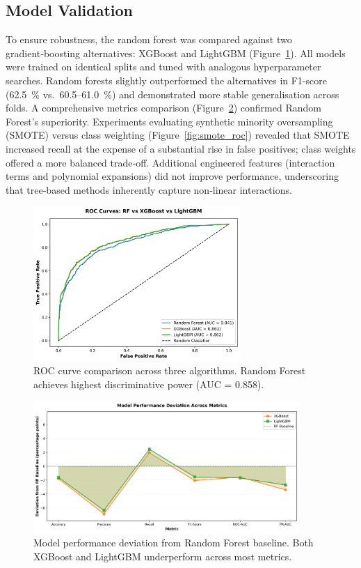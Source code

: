 \documentclass[12pt]{article}
\begin{document}
\subsection{Model Validation}
To ensure robustness, the random forest was compared against two gradient‑boosting alternatives: XGBoost and LightGBM (Figure~\ref{fig:model_comparison}).  All models were trained on identical splits and tuned with analogous hyperparameter searches.  Random forests slightly outperformed the alternatives in F1‑score (62.5~\% vs.\ 60.5–61.0~\%) and demonstrated more stable generalisation across folds.  A comprehensive metrics comparison (Figure~\ref{fig:metrics_comparison}) confirmed Random Forest's superiority.  Experiments evaluating synthetic minority oversampling (SMOTE) versus class weighting (Figure~\ref{fig:smote_roc}) revealed that SMOTE increased recall at the expense of a substantial rise in false positives; class weights offered a more balanced trade‑off.  Additional engineered features (interaction terms and polynomial expansions) did not improve performance, underscoring that tree‑based methods inherently capture non‑linear interactions.

\begin{figure}[H]
\centering
\includegraphics[width=0.7\textwidth]{img/21_model_comparison_roc.png}
\caption{ROC curve comparison across three algorithms. Random Forest achieves highest discriminative power (AUC = 0.858).}
\label{fig:model_comparison}
\end{figure}

\begin{figure}[H]
\centering
\includegraphics[width=0.9\textwidth]{img/24_model_comparison_metrics.png}
\caption{Model performance deviation from Random Forest baseline. Both XGBoost and LightGBM underperform across most metrics.}
\label{fig:metrics_comparison}
\end{figure}
\end{document}
